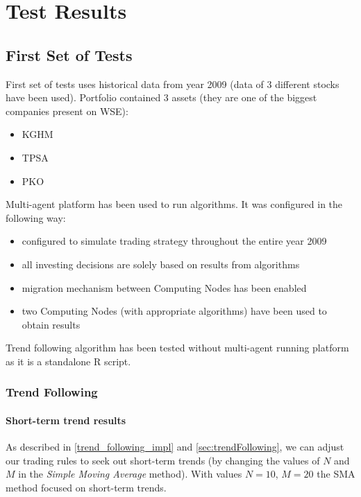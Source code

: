 \chapter{Test Results}
\label{cha:pierwszyDokument}

\section{First Set of Tests}
\label{sec:first_set_of_tests}

First set of tests uses historical data from year 2009 (data of 3 different stocks have been used). 
Portfolio contained 3 assets (they are one of the biggest companies present on WSE):

\begin{itemize} 
  \item KGHM
  \item TPSA
  \item PKO
\end{itemize}

Multi-agent platform has been used to run algorithms.
It was configured in the following way: 

\begin{itemize}
  \item configured to simulate trading strategy throughout the entire year 2009
  \item all investing decisions are solely based on results from algorithms
  \item migration mechanism between Computing Nodes has been enabled
  \item two Computing Nodes (with appropriate algorithms) have been used to obtain results
\end{itemize}

Trend following algorithm has been tested without multi-agent running platform as it is a standalone R script.

\subsection{Trend Following}

\subsubsection{Short-term trend results}

As described in \ref{trend_following_impl} and \ref{sec:trendFollowing}, we can adjust our trading rules to seek out short-term trends
 (by changing the values of $N$ and $M$ in the \emph{Simple Moving Average} method).
With values $N = 10$, $M = 20$ the SMA method focused on short-term trends.
 

